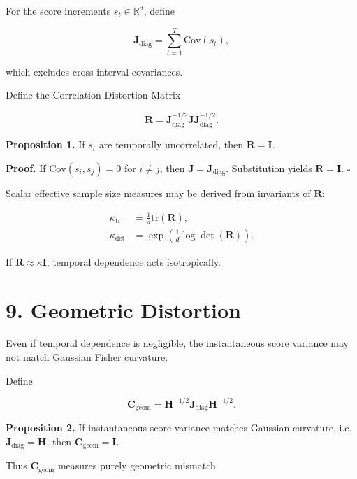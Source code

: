 \documentclass[11pt]{article}
\begin{document}
For the score increments $s_t \in \mathbb R^d$, define

\begin{equation}
\mathbf J_{\mathrm{diag}}
=
\sum_{t=1}^T \mathrm{Cov}(s_t),
\end{equation}

which excludes cross-interval covariances.

Define the Correlation Distortion Matrix

\begin{equation}
\mathbf R
=
\mathbf J_{\mathrm{diag}}^{-1/2}
\mathbf J
\mathbf J_{\mathrm{diag}}^{-1/2}.
\end{equation}

\textbf{Proposition 1.}
If $s_t$ are temporally uncorrelated, then $\mathbf R = \mathbf I$.

\textbf{Proof.}
If $\mathrm{Cov}(s_i,s_j)=0$ for $i\neq j$, then
$\mathbf J = \mathbf J_{\mathrm{diag}}$.
Substitution yields $\mathbf R = \mathbf I$.
\hfill$\square$

Scalar effective sample size measures may be derived from invariants of $\mathbf R$:

\begin{align}
\kappa_{\mathrm{tr}} &= \frac{1}{d}\mathrm{tr}(\mathbf R), \\
\kappa_{\mathrm{det}} &= \exp\!\left(\frac{1}{d}\log\det(\mathbf R)\right).
\end{align}

If $\mathbf R \approx \kappa \mathbf I$, temporal dependence acts isotropically.

\section*{9. Geometric Distortion}

Even if temporal dependence is negligible, the instantaneous score variance
may not match Gaussian Fisher curvature.

Define

\begin{equation}
\mathbf C_{\mathrm{geom}}
=
\mathbf H^{-1/2}
\mathbf J_{\mathrm{diag}}
\mathbf H^{-1/2}.
\end{equation}

\textbf{Proposition 2.}
If instantaneous score variance matches Gaussian curvature,
i.e. $\mathbf J_{\mathrm{diag}} = \mathbf H$,
then $\mathbf C_{\mathrm{geom}} = \mathbf I$.

Thus $\mathbf C_{\mathrm{geom}}$ measures purely geometric mismatch.
\end{document}
